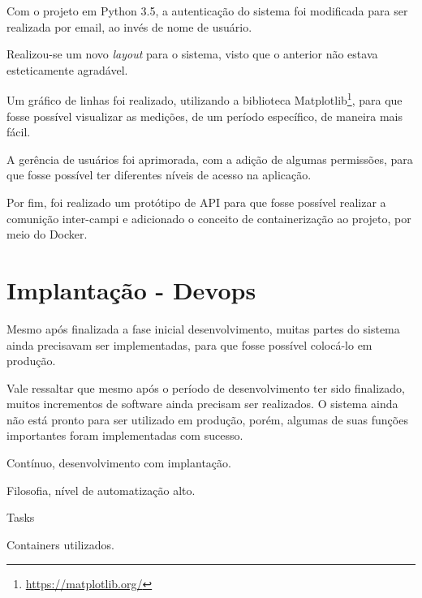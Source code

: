 Com o projeto em Python 3.5, a autenticação do sistema foi modificada para ser realizada por email, ao invés de nome de usuário.

Realizou-se um novo \textit{layout} para o sistema, visto que o anterior não estava esteticamente agradável.

Um gráfico de linhas foi realizado, utilizando a biblioteca Matplotlib\footnote{\url{https://matplotlib.org/}}, para que fosse possível visualizar as medições, de um período específico, de maneira mais fácil.

A gerência de usuários foi aprimorada, com a adição de algumas permissões, para que fosse possível ter diferentes níveis de acesso na aplicação.

Por fim, foi realizado um protótipo de API para que fosse possível realizar a comunição inter-campi e adicionado o conceito de containerização ao projeto, por meio do Docker.

\section{Implantação - Devops}
Mesmo após finalizada a fase inicial desenvolvimento, muitas partes do sistema ainda precisavam ser implementadas, para que fosse possível colocá-lo em produção.

Vale ressaltar que mesmo após o período de desenvolvimento ter sido finalizado, muitos incrementos de software ainda precisam ser realizados. O sistema ainda não está pronto para ser utilizado em produção, porém, algumas de suas funções importantes foram implementadas com sucesso.

Contínuo, desenvolvimento com implantação.

Filosofia, nível de automatização alto.

Tasks

Containers utilizados.